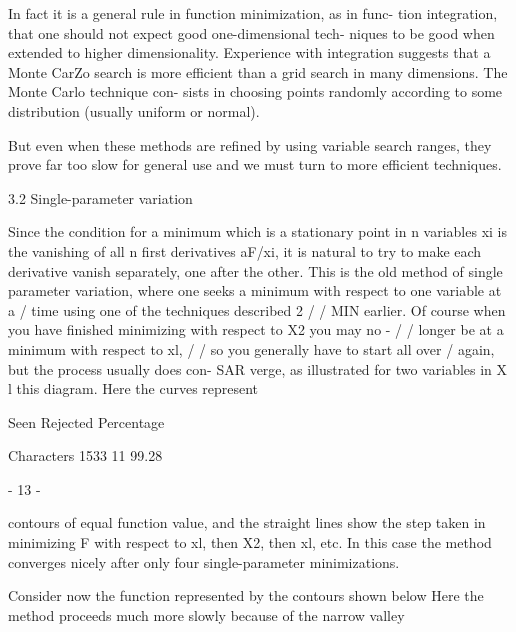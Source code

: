         In fact it is a general rule in function minimization, as in func-
   tion integration, that one should not expect good one-dimensional tech-
   niques to be good when extended to higher dimensionality.  Experience
   with integration suggests that a Monte CarZo search is more efficient
   than a grid search in many dimensions.  The Monte Carlo technique con-
   sists in choosing points randomly according to some distribution
   (usually uniform or normal).
 
        But even when these methods are refined by using variable search
   ranges, they prove far too slow for general use and we must turn to more
   efficient techniques.
 
 
   3.2  Single-parameter variation
 
        Since the condition for a minimum which is a stationary point in
   n variables xi is the vanishing of all n first derivatives aF/xi, it is
   natural to try to make each derivative vanish separately, one after the
   other.  This is the old method of single
   parameter variation, where one seeks a
   minimum with respect to one variable at a
       /           time using one of the techniques described
2 / /   MIN earlier.  Of course when you have finished
                                  minimizing with respect to X2 you may no
               -  / /            longer be at a minimum with respect to xl,
                    / /           so you generally have to start all over
       /                        again, but the process usually does con-
   SAR                          verge, as illustrated for two variables in
                           X l
                                  this diagram. Here the curves represent
 
                 Seen Rejected  Percentage
 
Characters       1533       11   99.28
 
                                - 13 -
 
 
contours of equal function value, and the straight lines show the step
taken in minimizing F with respect to xl, then X2, then xl, etc.  In
this case the method converges nicely after only four single-parameter
minimizations.
 
     Consider now the function represented by the contours shown below
Here the method proceeds much more slowly because of the narrow valley
 
 
 
 
 
 
 
